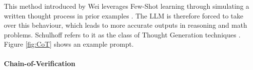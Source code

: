 This method introduced by Wei leverages Few-Shot learning through simulating a written thought process in prior examples \cite{Wei.28.01.2022}. The LLM is therefore forced to take over this behaviour, which leads to more accurate outputs in reasoning and math problems. Schulhoff refers to it as the class of Thought Generation techniques \cite{Schulhoff.06.06.2024}. Figure \ref{fig:CoT} shows an example prompt.

\paragraph{Chain-of-Verification}
